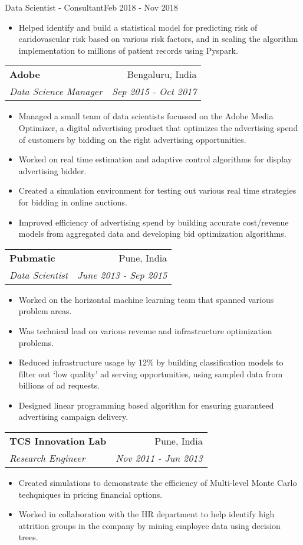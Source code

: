\documentclass[letterpaper,11pt]{article}
\makeatletter
\newcommand{\resumeSubheading}[4]{
  \vspace{-1pt}\item
    \begin{tabular*}{0.97\textwidth}[t]{l@{\extracolsep{\fill}}r}
      \textbf{#1} & #2 \\
      \textit{\small#3} & \textit{\small #4} \\
    \end{tabular*}\vspace{-5pt}
}
\makeatother
\begin{document}
      {Data Scientist - Consultant}{Feb 2018 - Nov 2018}
\begin{itemize}
\item Helped identify and build a statistical model for
        predicting risk of caridovascular risk based on various risk factors, and in scaling the algorithm implementation to millions of patient records using Pyspark.
\end{itemize}
\resumeSubheading
	{Adobe}{Bengaluru, India}
	{Data Science Manager}{Sep 2015 - Oct 2017}
\begin{itemize}
	\item Managed a small team of data scientists focussed on the Adobe Media Optimizer, a digital advertising product that optimizes the advertising spend of customers by bidding on the right advertising opportunities.
        \item Worked on real time estimation and adaptive control algorithms for display advertising bidder.
        \item Created a simulation environment for testing out various real time strategies for bidding in online auctions.
        \item Improved efficiency of advertising spend  by building accurate cost/revenue models from aggregated data and developing bid optimization algorithms.    
\end{itemize}

\resumeSubheading
	{Pubmatic}{Pune, India}
	{Data Scientist}{June 2013 - Sep 2015}
\begin{itemize}
	\item Worked on the horizontal machine learning team that spanned various problem areas.
       \item Was technical lead on various revenue and infrastructure optimization problems.
        \item Reduced infrastructure usage by 12\% by building classification models to filter out ‘low quality’ ad serving opportunities, using sampled data from billions of ad requests.
        \item Designed linear programming based algorithm for ensuring guaranteed advertising campaign delivery.
\end{itemize}

\resumeSubheading
	{TCS Innovation Lab}{Pune, India}
	{Research Engineer}{Nov 2011 - Jun 2013}
\begin{itemize}
	  \item  Created simulations to demonstrate the efficiency of Multi-level Monte Carlo techqniques in pricing financial options.
	\item Worked in collaboration with the HR department to help identify high attrition groups in the company by mining employee data using decision trees.   
\end{itemize}
\end{document}
